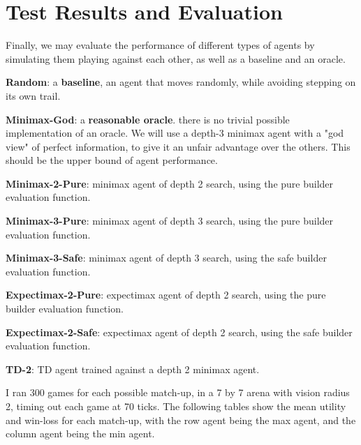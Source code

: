 \documentclass{article}
\begin{document}
\section{Test Results and Evaluation}

Finally, we may evaluate the performance of different types of agents by simulating them playing against each other, as well as a baseline and an oracle.

\textbf{Random}: a \textbf{baseline}, an agent that moves randomly, while avoiding stepping on its own trail.

\textbf{Minimax-God}: a \textbf{reasonable oracle}. there is no trivial possible implementation of an oracle. We will use a depth-3 minimax agent with a "god view" of perfect information, to give it an unfair advantage over the others. This should be the upper bound of agent performance.

\textbf{Minimax-2-Pure}: minimax agent of depth 2 search, using the pure builder evaluation function.

\textbf{Minimax-3-Pure}: minimax agent of depth 3 search, using the pure builder evaluation function.

\textbf{Minimax-3-Safe}: minimax agent of depth 3 search, using the safe builder evaluation function.

\textbf{Expectimax-2-Pure}: expectimax agent of depth 2 search, using the pure builder evaluation function.

\textbf{Expectimax-2-Safe}: expectimax agent of depth 2 search, using the safe builder evaluation function.

\textbf{TD-2}: TD agent trained against a depth 2 minimax agent.


I ran 300 games for each possible match-up, in a 7 by 7 arena with vision radius 2, timing out each game at 70 ticks. The following tables show the mean utility and win-loss for each match-up, with the row agent being the max agent, and the column agent being the min agent. 
\end{document}
